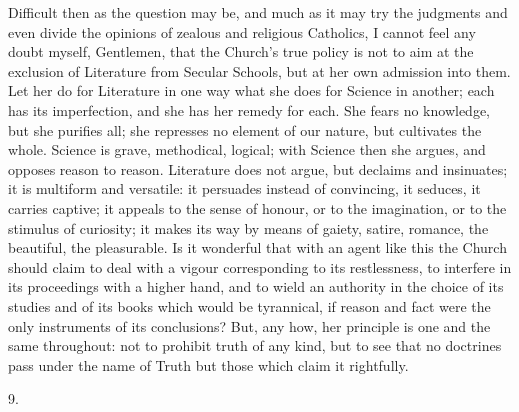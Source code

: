 Difficult then as the question may be, and much as it may try the
judgments and even divide the opinions of zealous and religious
Catholics, I cannot feel any doubt myself, Gentlemen, that the Church's
true policy is not to aim at the exclusion of Literature from Secular
Schools, but at her own admission into them. Let her do for
Literature in one way what she does for Science in another; each has
its imperfection, and she has her remedy for each. She fears no
knowledge, but she purifies all; she represses no element of our
nature, but cultivates the whole. Science is grave, methodical,
logical; with Science then she argues, and opposes reason to reason.
Literature does not argue, but declaims and insinuates; it is
multiform and versatile: it persuades instead of convincing, it
seduces, it carries captive; it appeals to the sense of honour, or to
the imagination, or to the stimulus of curiosity; it makes its way by
means of gaiety, satire, romance, the beautiful, the pleasurable. Is
it wonderful that with an agent like this the Church should claim to
deal with a vigour corresponding to its restlessness, to interfere in
its proceedings with a higher hand, and to wield an authority in the
choice of its studies and of its books which would be tyrannical, if
reason and fact were the only instruments of its conclusions? But, any
how, her principle is one and the same throughout: not to prohibit
truth of any kind, but to see that no doctrines pass under the name of
Truth but those which claim it rightfully.

9.

